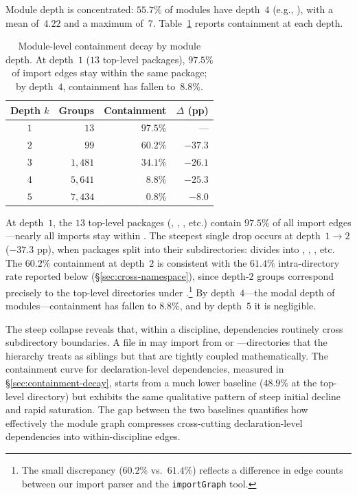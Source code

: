 Module depth is concentrated: $55.7\%$ of modules have depth~$4$ (e.g., ), with a mean of~$4.22$ and a maximum of~$7$. Table~\ref{tab:module-containment} reports containment at each depth.

\begin{table}[ht]
\centering
\caption{Module-level containment decay by module depth. At depth~$1$ ($13$ top-level packages), $97.5\%$ of import edges stay within the same package; by depth~$4$, containment has fallen to~$8.8\%$.}
\label{tab:module-containment}
\begin{tabular}{crrr}
\toprule
Depth $k$ & Groups & Containment & $\Delta$ (pp) \\
\midrule
$1$ & $13$      & $97.5\%$  & ---     \\
$2$ & $99$      & $60.2\%$  & $-37.3$ \\
$3$ & $1{,}481$ & $34.1\%$  & $-26.1$ \\
$4$ & $5{,}641$ & $8.8\%$   & $-25.3$ \\
$5$ & $7{,}434$ & $0.8\%$   & $-8.0$  \\
\bottomrule
\end{tabular}
\end{table}

At depth~$1$, the $13$ top-level packages (, , , etc.) contain $97.5\%$ of all import edges---nearly all imports stay within . The steepest single drop occurs at depth~$1 \to 2$ ($-37.3$ pp), when packages split into their subdirectories:  divides into , , , etc. The $60.2\%$ containment at depth~$2$ is consistent with the $61.4\%$ intra-directory rate reported below (\S\ref{sec:cross-namespace}), since depth-$2$ groups correspond precisely to the top-level directories under .\footnote{The small discrepancy ($60.2\%$ vs.\ $61.4\%$) reflects a difference in edge counts between our import parser and the \texttt{importGraph} tool.} By depth~$4$---the modal depth of modules---containment has fallen to $8.8\%$, and by depth~$5$ it is negligible.

The steep collapse reveals that, within a discipline, dependencies routinely cross subdirectory boundaries. A file in  may import from  or ---directories that the hierarchy treats as siblings but that are tightly coupled mathematically. The containment curve for declaration-level dependencies, measured in \S\ref{sec:containment-decay}, starts from a much lower baseline ($48.9\%$ at the top-level directory) but exhibits the same qualitative pattern of steep initial decline and rapid saturation. The gap between the two baselines quantifies how effectively the module graph compresses cross-cutting declaration-level dependencies into within-discipline edges.

